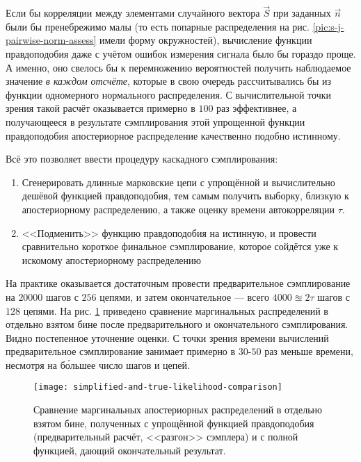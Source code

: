 Если бы корреляции между элементами случайного вектора $\vec{S}$ при заданных $\vec{n}$ были бы пренебрежимо малы (то есть попарные распределения на рис. \ref{pic:s-j-pairwise-norm-assess} имели форму окружностей), вычисление функции правдоподобия даже с учётом ошибок измерения сигнала было бы гораздо проще. А именно, оно свелось бы к перемножению вероятностей получить наблюдаемое значение \textit{в каждом отсчёте}, которые в свою очередь рассчитывались бы из функции одномерного нормального распределения. С вычислительной точки зрения такой расчёт оказывается примерно в $100$ раз эффективнее, а получающееся в результате сэмплирования этой упрощенной функции правдоподобия апостериорное распределение качественно подобно истинному.

Всё это позволяет ввести процедуру каскадного сэмплирования:

\begin{enumerate}
	\item Сгенерировать длинные марковские цепи с упрощённой и вычислительно дешёвой функцией правдоподобия, тем самым получить выборку, близкую к апостериорному распределению, а также оценку времени автокорреляции $\tau$.
	\item <<Подменить>> функцию правдоподобия на истинную, и провести сравнительно короткое финальное сэмплирование, которое сойдётся уже к искомому апостериорному распределению
\end{enumerate}

На практике оказывается достаточным провести предварительное сэмплирование на $20000$ шагов с $256$ цепями, и затем окончательное --- всего $4000 \approxeq 2 \tau$ шагов с $128$ цепями. На рис. \ref{pic:simplified-and-true-likelihood-comparison} приведено сравнение маргинальных распределений в отдельно взятом бине после предварительного и окончательного сэмплирования. Видно постепенное уточнение оценки. С точки зрения времени вычислений предварительное сэмплирование занимает примерно в $30$-$50$ раз меньше времени, несмотря на б\'{о}льшее число шагов и цепей.

\begin{figure}
	\centering
	\texttt{[image: simplified-and-true-likelihood-comparison]}
	\caption{Сравнение маргинальных апостериорных распределений в отдельно взятом бине, полученных с упрощённой функцией правдоподобия (предварительный расчёт, <<разгон>> сэмплера) и с полной функцией, дающий окончательный результат.}
	\label{pic:simplified-and-true-likelihood-comparison}
\end{figure}


